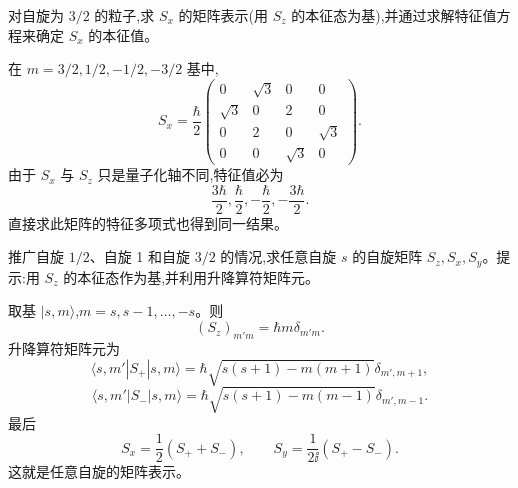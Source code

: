 \begin{question}
对自旋为 $3/2$ 的粒子,求 $S_x$ 的矩阵表示(用 $S_z$ 的本征态为基),并通过求解特征值方程来确定 $S_x$ 的本征值。
\end{question}
\begin{solution}

在 $m=3/2,1/2,-1/2,-3/2$ 基中,
\[
S_x=\frac{\hbar}{2}\begin{pmatrix}
0&\sqrt3&0&0\\
\sqrt3&0&2&0\\
0&2&0&\sqrt3\\
0&0&\sqrt3&0
\end{pmatrix}.
\]
由于 $S_x$ 与 $S_z$ 只是量子化轴不同,特征值必为
\[
\frac{3\hbar}{2},\frac{\hbar}{2},-\frac{\hbar}{2},-\frac{3\hbar}{2}.
\]
直接求此矩阵的特征多项式也得到同一结果。

\end{solution}

\begin{question}
推广自旋 $1/2$、自旋 1 和自旋 $3/2$ 的情况,求任意自旋 $s$ 的自旋矩阵 $S_z,S_x,S_y$。提示:用 $S_z$ 的本征态作为基,并利用升降算符矩阵元。
\end{question}
\begin{solution}

取基 $|s,m\rangle$,$m=s,s-1,\ldots,-s$。则
\[
(S_z)_{m'm}=\hbar m\delta_{m'm}.
\]
升降算符矩阵元为
\[
\langle s,m'|S_+|s,m\rangle=
\hbar\sqrt{s(s+1)-m(m+1)}\delta_{m',m+1},
\]
\[
\langle s,m'|S_-|s,m\rangle=
\hbar\sqrt{s(s+1)-m(m-1)}\delta_{m',m-1}.
\]
最后
\[
S_x=\frac12(S_++S_-),
\qquad
S_y=\frac{1}{2\ii}(S_+-S_-).
\]
这就是任意自旋的矩阵表示。

\end{solution}


